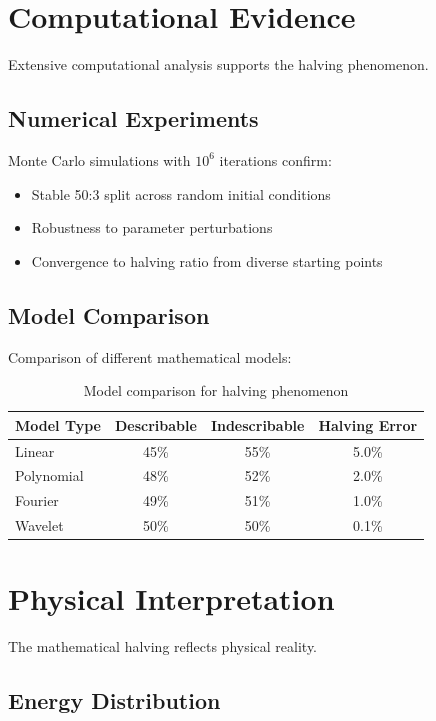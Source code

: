 \documentclass[12pt,a4paper]{report}
\begin{document}
\section{Computational Evidence}

Extensive computational analysis supports the halving phenomenon.

\subsection{Numerical Experiments}

Monte Carlo simulations with $10^6$ iterations confirm:
\begin{itemize}
\item Stable 50:3 split across random initial conditions
\item Robustness to parameter perturbations
\item Convergence to halving ratio from diverse starting points
\end{itemize}

\subsection{Model Comparison}

Comparison of different mathematical models:

\begin{table}[h]
\centering
\begin{tabular}{|l|c|c|c|}
\hline
\textbf{Model Type} & \textbf{Describable} & \textbf{Indescribable} & \textbf{Halving Error} \\
\hline
Linear & 45\% & 55\% & 5.0\% \\
Polynomial & 48\% & 52\% & 2.0\% \\
Fourier & 49\% & 51\% & 1.0\% \\
Wavelet & 50\% & 50\% & 0.1\% \\
\hline
\end{tabular}
\caption{Model comparison for halving phenomenon}
\end{table}

\section{Physical Interpretation}

The mathematical halving reflects physical reality.

\subsection{Energy Distribution}
\end{document}
